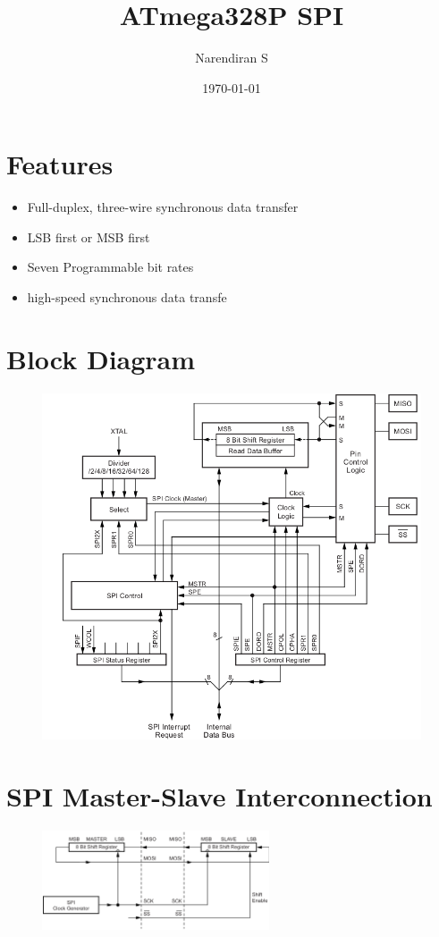 \documentclass{article}
\title{ATmega328P SPI}
\author{Narendiran S}
\date{\today}
\begin{document}
\maketitle

\section{Features}
\begin{itemize}
    \item Full-duplex, three-wire synchronous data transfer
    \item LSB first or MSB first
    \item Seven Programmable bit rates
    \item high-speed synchronous data transfe
\end{itemize}

\section{Block Diagram}
\begin{figure}[H]
    \centering
    \includegraphics[height=0.6\textheight]{SPIBlockDiagram.png}
\end{figure}

\section{SPI Master-Slave Interconnection}
\begin{figure}[H]
    \centering
    \includegraphics[width=0.6\textwidth]{SPIInterconnection.png}
\end{figure}
\end{document}

